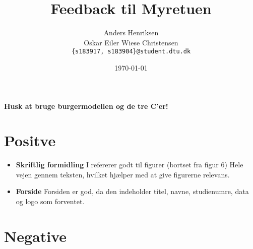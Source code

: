 \documentclass[11pt, fleqn, titlepage]{article}
\title{Feedback til Myretuen}
\author{Anders Henriksen \\ Oskar Eiler Wiese Christensen  \\ \texttt{\{s183917, s183904\}@student.dtu.dk}}
\date{\today}
\begin{document}
	
	\maketitle
	
	\textbf{Husk at bruge burgermodellen og de tre C'er!}
	
	\section{Positve}
	
	\begin{itemize}
		\item \textbf{Skriftlig formidling} I refererer godt til figurer (bortset fra figur 6) Hele vejen gennem teksten, hvilket hjælper med at give figurerne relevans. 
		
		\item \textbf{Forside} Forsiden er god, da den indeholder titel, navne, studienumre, data og logo som forventet.
		
	\end{itemize}
	
	\section{Negative}
	
\end{document}
